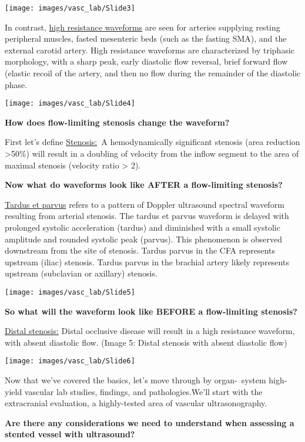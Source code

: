 \documentclass[
]{book}
\begin{document}
\texttt{[image: images/vasc\_lab/Slide3]}

In contrast, \uline{high resistance waveforms} are seen for
arteries supplying resting peripheral muscles, fasted mesenteric beds
(such as the fasting SMA), and the external carotid artery. High
resistance waveforms are characterized by triphasic morphology, with a
sharp peak, early diastolic flow reversal, brief forward flow (elastic
recoil of the artery, and then no flow during the remainder of the
diastolic phase.

\texttt{[image: images/vasc\_lab/Slide4]}

\textbf{How does flow-limiting stenosis change the waveform?}

First let's define \uline{Stenosis:}~A hemodynamically significant
stenosis (area reduction \textgreater50\%) will result in a doubling of velocity
from the inflow segment to the area of maximal stenosis (velocity ratio
\textgreater{} 2).

\textbf{Now what do waveforms look like AFTER a flow-limiting stenosis?}

\uline{Tardus et parvus} refers to a pattern of Doppler ultrasound
spectral waveform resulting from arterial stenosis. The tardus et parvus
waveform is delayed with prolonged systolic acceleration (tardus) and
diminished with a small systolic amplitude and rounded systolic peak
(parvus). This phenomenon is observed downstream from the site of
stenosis. Tardus parvus in the CFA represents upstream (iliac) stenosis.
Tardus parvus in the brachial artery likely represents upstream
(subclavian or axillary) stenosis.\citep{hwang2017, pellerito2019}

\texttt{[image: images/vasc\_lab/Slide5]}

\textbf{So what will the waveform look like BEFORE a flow-limiting stenosis?}

\uline{Distal stenosis:} Distal occlusive disease will result in a
high resistance waveform, with absent diastolic flow. (Image 5: Distal
stenosis with absent diastolic flow)

\texttt{[image: images/vasc\_lab/Slide6]}

Now that we've covered the basics, let's move through by organ-~system
high-yield vascular lab studies, findings, and pathologies.We'll start
with the extracranial evaluation, a highly-tested area of vascular
ultrasonography.

\textbf{Are there any considerations we need to understand when assessing a
stented vessel with ultrasound?}
\end{document}
